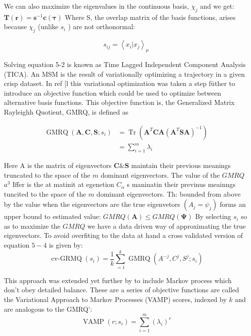 We can also maximize the eigenvalues in the continuous basis, $\chi_{j}$ and we get:
$\mathbf{T}(\mathbf{r})=\mathbf{s}^{-1} \mathbf{c}(\mathbf{\tau})$
Where S, the overlap matrix of the basis functions, arises because $\chi_{j}$ (unlike $s_{i}$ ) are not orthonormal:

\begin{equation}
s_{i j}=\left\langle x_{i} | x_{j}\right\rangle_{\mu}
\end{equation}

Solving equation 5-2 is known as Time Lagged Independent Component Analysis (TICA).
An MSM is the result of variationally optimizing a trajectory in a given crisp dataset. In ref $[\mathrm{l}$ this variational optimization was taken a step füther to introduce an objective function which could be used to optimize between alternative basis functions. This objective function is, the Generalized Matrix Rayleighh Quotient, GMRQ, is defined as

\begin{equation}
\begin{split}
\operatorname{GMRQ}\left(\mathbf{A}, \mathbf{C}, \mathbf{S} ; s_{i}\right) &=\operatorname{Tr}\left(\mathbf{A}^{T} \mathbf{C A}\left(\mathbf{A}^{T} \mathbf{S} \mathbf{A}\right)^{-1}\right) \\
&=\sum_{i=1}^{m} \lambda_{i}
\end{split}
\end{equation}

Here A is the matrix of eigenvectors $\mathbf{C} \& \mathbf{S}$ maintain their previous meanings truncated to the space of the $m$ dominant eigenvectors. The value of the $G M R Q$ $a^{3}$
Iffer is the at matinit at egenetion $C_{\alpha}$ s maninatin their previnus meainngs tuncited to the space of the $m$ dominant eigenvectors. Th: bounded from above by the value when the eigenvectors are the true eigenvetors $\left(A_{j}=\psi_{j}\right)$ forms an upper bound to estimated value:
$G M R Q(\mathbf{A}) \leq G M R Q(\boldsymbol{\Psi})$
By selecting $s_{i}$ so as to maximize the $G M R Q$ we have a data driven way of approximating the true eigenvectors. To avoid overfiting to the data at hand a cross validated version of equation $5-4$ is given by:
\begin{equation}
\operatorname{cv-GRMQ}(s_{i})=\frac{1}{k} \sum_{=1}^{k} \operatorname{GMRQ}\left(A^{-j}, C^{j}, S^{j} ; s_{i}\right)
\end{equation}

This approach was extended yet further by to include Markov process which don't obey detailed balance. These are a series of objective functions are called the Variational Approach to Markov Processes (VAMP) scores, indexed by $k$ and are analogous to the GMRQ':
\begin{equation}\label{eqn:def_vampr}
\operatorname{VAMP}(r ; s_{i})=\sum_{i=1}^{m}\left(\lambda_{i}\right)^{r}
\end{equation}

